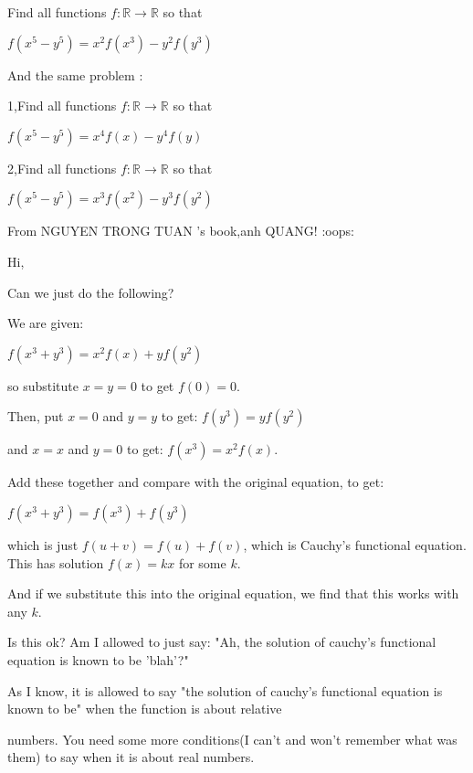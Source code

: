 \begin{mysolution}
	\begin{tcolorbox}Find all functions $ f: \mathbb{R}\to\mathbb{R}$ so that 

$ f(x^{5} - y^{5}) = x^{2}f(x^{3}) - y^{2}f(y^{3})$

And the same problem :

1,Find all functions $ f: \mathbb{R}\to\mathbb{R}$ so that 

$ f(x^{5} - y^{5}) = x^{4}f(x) - y^{4}f(y)$

2,Find all functions $ f: \mathbb{R}\to\mathbb{R}$ so that 

$ f(x^{5} - y^{5}) = x^{3}f(x^{2}) - y^{3}f(y^{2})$\end{tcolorbox}

From NGUYEN TRONG TUAN 's book,anh QUANG! :oops:
\end{mysolution}



\begin{mysolution}
	\begin{tcolorbox}Hi,

Can we just do the following?

We are given:

$ f(x^{3} + y^{3}) = x^{2}f(x) + yf(y^2)$

so substitute $ x = y = 0$ to get $ f(0) = 0$.

Then, put $ x = 0$ and $ y = y$ to get: $ f(y^{3}) = y f(y^{2})$

and $ x = x$ and $ y = 0$ to get: $ f(x^{3}) = x^{2}f(x)$.

Add these together and compare with the original equation, to get:

$ f(x^{3} + y^{3}) = f(x^{3}) + f(y^{3})$

which is just $ f(u + v) = f(u) + f(v)$, which is Cauchy's functional equation. This has solution $ f(x) = kx$ for some $ k$.

And if we substitute this into the original equation, we find that this works with any $ k$.

Is this ok? Am I allowed to just say: "Ah, the solution of cauchy's functional equation is known to be 'blah'?"\end{tcolorbox}

As I know, it is allowed to say "the solution of cauchy's functional equation is known to be" when the function is about relative 

numbers. You need some more conditions(I can't and won't remember what was them) to say when it is about real numbers.
\end{mysolution}






